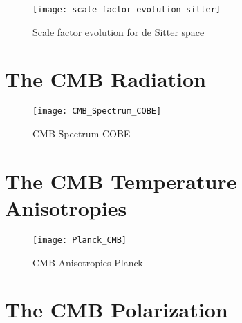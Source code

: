 \begin{figure}
        \centering
        \texttt{[image: scale\_factor\_evolution\_sitter]}
        \caption{Scale factor evolution for de Sitter space}
        \label{fig:scale_factor_evolution_sitter}
\end{figure}

\section{The CMB Radiation}

\begin{figure}
        \centering
        \texttt{[image: CMB\_Spectrum\_COBE]}
        \caption{CMB Spectrum COBE}
        \label{fig:cmb_spectrum_cobe}
\end{figure}

\section{The CMB Temperature Anisotropies}

\begin{figure}
        \centering
        \texttt{[image: Planck\_CMB]}
        \caption{CMB Anisotropies Planck}
        \label{fig:plack_cmb}
\end{figure}

\section{The CMB Polarization}
